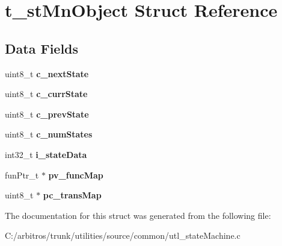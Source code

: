 \hypertarget{structt__st_mn_object}{\section{t\-\_\-st\-Mn\-Object Struct Reference}
\label{structt__st_mn_object}
}
\subsection*{Data Fields}
\begin{DoxyCompactItemize}
\item 
\hypertarget{structt__st_mn_object_a3e14c6515e211d92dc83ed436bd0abe5}{uint8\-\_\-t {\bfseries c\-\_\-next\-State}}\label{structt__st_mn_object_a3e14c6515e211d92dc83ed436bd0abe5}

\item 
\hypertarget{structt__st_mn_object_aec1a52a515e5ff4693bd4dedeb3a9b67}{uint8\-\_\-t {\bfseries c\-\_\-curr\-State}}\label{structt__st_mn_object_aec1a52a515e5ff4693bd4dedeb3a9b67}

\item 
\hypertarget{structt__st_mn_object_a0ce3886e635acebea85d5d8b7b36ba6b}{uint8\-\_\-t {\bfseries c\-\_\-prev\-State}}\label{structt__st_mn_object_a0ce3886e635acebea85d5d8b7b36ba6b}

\item 
\hypertarget{structt__st_mn_object_a89f90dc9d43fb708c98ea815c16d7109}{uint8\-\_\-t {\bfseries c\-\_\-num\-States}}\label{structt__st_mn_object_a89f90dc9d43fb708c98ea815c16d7109}

\item 
\hypertarget{structt__st_mn_object_a61b0a89671066c62b5f52999ad985681}{int32\-\_\-t {\bfseries i\-\_\-state\-Data}}\label{structt__st_mn_object_a61b0a89671066c62b5f52999ad985681}

\item 
\hypertarget{structt__st_mn_object_aee43024eba4dbf9e777d3cf36ba2c572}{fun\-Ptr\-\_\-t $\ast$ {\bfseries pv\-\_\-func\-Map}}\label{structt__st_mn_object_aee43024eba4dbf9e777d3cf36ba2c572}

\item 
\hypertarget{structt__st_mn_object_a91c32ebc6e122c093730d881e35d7ca8}{uint8\-\_\-t $\ast$ {\bfseries pc\-\_\-trans\-Map}}\label{structt__st_mn_object_a91c32ebc6e122c093730d881e35d7ca8}

\end{DoxyCompactItemize}


The documentation for this struct was generated from the following file\-:\begin{DoxyCompactItemize}
\item 
C\-:/arbitros/trunk/utilities/source/common/utl\-\_\-state\-Machine.\-c\end{DoxyCompactItemize}
